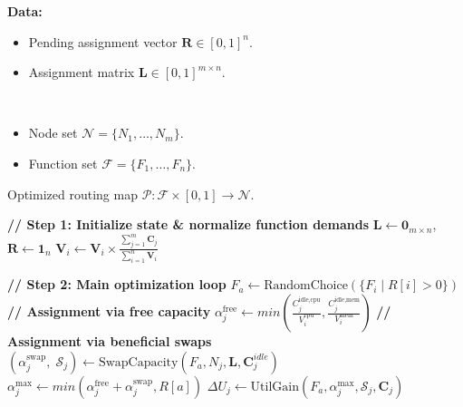 {
\begin{algorithm}[t]
    \caption{\mbox{Complementary swarming routing.}}
    \noindent \textbf{Data:}
    \begin{algorithmic}[1]
    \Statex \begin{itemize}
        \setlength{\itemindent}{.0em} %
        \item Pending assignment vector \(\mathbf{R} \in [0,1]^n\).
        \item Assignment matrix \(\mathbf{L} \in [0,1]^{m \times n}\).
    \end{itemize}
    \Require $ $
    \Statex \begin{itemize}
        \setlength{\itemindent}{.0em} %
        \item Node set \(\mathcal{N} = \{N_1, \dots, N_m\}\).
        \item Function set \(\mathcal{F} = \{F_1, \dots, F_n\}\).
    \end{itemize}
    \Ensure Optimized routing map $\mathcal{P}: \mathcal{F} \times [0,1] \to \mathcal{N}$.
    
    \State \textbf{// Step 1: Initialize state \& normalize function demands}
    \State \(\mathbf{L} \gets \mathbf{0}_{m \times n}\), \(\mathbf{R} \gets \mathbf{1}_n\)
        \State $\mathbf{V}_i \gets \mathbf{V}_i \times \frac{\sum_{j=1}^{m} \mathbf{C}_j}{\sum_{i=1}^{n} \mathbf{V}_i}$ 
    \EndFor
    \State
    
    \State \textbf{// Step 2: Main optimization loop}
     
        \State $F_a \gets \text{RandomChoice}(\{F_i \mid R[i] > 0\})$ 
            \State \textbf{// Assignment via free capacity}
            \State $\alpha_j^{\text{free}} \gets min(\frac{C_j^{\text{idle,cpu}}}{V_i^{\text{cpu}}}, \frac{C_j^{\text{idle,mem}}}{V_i^{\text{mem}}})$
            \State \textbf{// Assignment via beneficial swaps}
            \State $(\alpha_j^{\text{swap}},\; \mathcal{S}_j) \gets \text{SwapCapacity}(F_a, N_j, \mathbf{L}, \mathbf{C}_j^{idle})$
            \State $\alpha_j^{\text{max}} \gets min(\alpha_j^{\text{free}} + \alpha_j^{\text{swap}}, R[a])$
            \State $\Delta U_j \gets \text{UtilGain}(F_a, \alpha_j^{\text{max}}, \mathcal{S}_j, \mathbf{C}_j)$
        \EndFor


\end{algorithmic}
\end{algorithm}}
